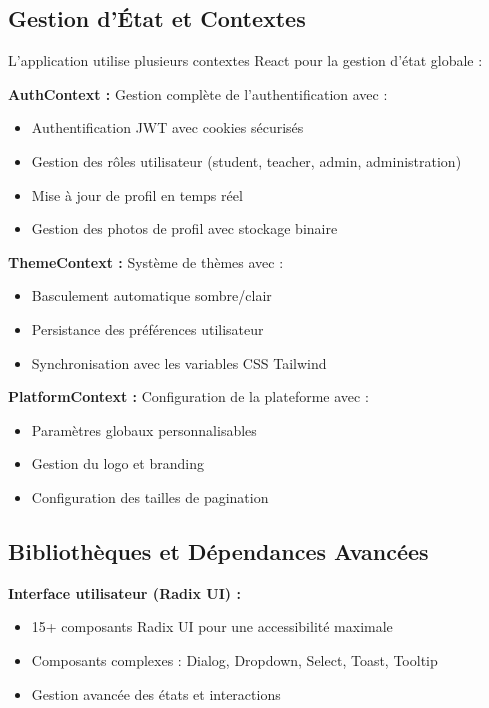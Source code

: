 \documentclass[12pt,a4paper]{article}
\begin{document}
\subsection{Gestion d'État et Contextes}

L'application utilise plusieurs contextes React pour la gestion d'état globale :

\textbf{AuthContext :} Gestion complète de l'authentification avec :
\begin{itemize}
    \item Authentification JWT avec cookies sécurisés
    \item Gestion des rôles utilisateur (student, teacher, admin, administration)
    \item Mise à jour de profil en temps réel
    \item Gestion des photos de profil avec stockage binaire
\end{itemize}

\textbf{ThemeContext :} Système de thèmes avec :
\begin{itemize}
    \item Basculement automatique sombre/clair
    \item Persistance des préférences utilisateur
    \item Synchronisation avec les variables CSS Tailwind
\end{itemize}

\textbf{PlatformContext :} Configuration de la plateforme avec :
\begin{itemize}
    \item Paramètres globaux personnalisables
    \item Gestion du logo et branding
    \item Configuration des tailles de pagination
\end{itemize}

\subsection{Bibliothèques et Dépendances Avancées}

\textbf{Interface utilisateur (Radix UI) :}
\begin{itemize}
    \item 15+ composants Radix UI pour une accessibilité maximale
    \item Composants complexes : Dialog, Dropdown, Select, Toast, Tooltip
    \item Gestion avancée des états et interactions
\end{itemize}
\end{document}

